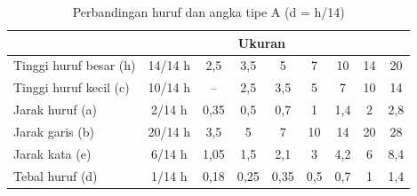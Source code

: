 \documentclass[../menggambarteknik.tex]{subfiles}
\begin{document}
\begin{table}[h]
	\centering
	\begin{tabularx}{\textwidth}{|>{\raggedright\arraybackslash}X|c|c|c|c|c|c|c|c|}
		\hline
		\multicolumn{2}{|c|}{\textbf{Penggunaan}}  &  \multicolumn{7}{c|}{\textbf{Ukuran}}  \\
		\hline
		Tinggi huruf besar (h)                     &  14/14 h                               &  2,5   &  3,5   &  5     &  7    &  10   &  14  &  20  \\
		\hline
		Tinggi huruf kecil (c)                     &  10/14 h                               &  --    &  2,5   &  3,5   &  5    &  7    &  10  &  14  \\
		\hline
		Jarak huruf (a)                            &  2/14 h                                &  0,35  &  0,5   &  0,7   &  1    &  1,4  &  2   &  2,8  \\
		\hline
		Jarak garis (b)                            &  20/14 h                               &  3,5   &  5     &  7     &  10   &  14   &  20  &  28  \\
		\hline
		Jarak kata (e)                             &  6/14 h                                &  1,05  &  1,5   &  2,1   &  3    &  4,2  &  6   &  8,4  \\
		\hline
		Tebal huruf (d)                            &  1/14 h                                &  0,18  &  0,25  &  0,35  &  0,5  &  0,7  &  1   &  1,4  \\
		\hline
	\end{tabularx}
	\caption{Perbandingan huruf dan angka tipe A (d = h/14)}
	\label{tb:perbandingana}
\end{table}
\end{document}
